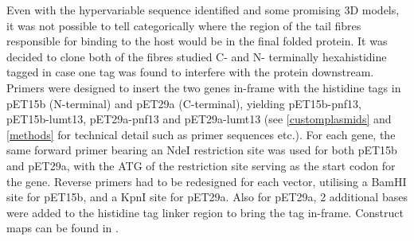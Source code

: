 Even with the hypervariable sequence identified and some promising 3D models, it was not possible to tell categorically where the region of the tail fibres responsible for binding to the host would be in the final folded protein. It was decided to clone both of the fibres studied C- and N- terminally hexahistidine tagged in case one tag was found to interfere with the protein downstream. Primers were designed to insert the two genes in-frame with the histidine tags in pET15b (N-terminal) and pET29a (C-terminal), yielding pET15b-pnf13, pET15b-lumt13, pET29a-pnf13 and pET29a-lumt13 (see \vref{customplasmids} and \vref{methods} for technical detail such as primer sequences etc.). For each gene, the same forward primer bearing an NdeI restriction site was used for both pET15b and pET29a, with the ATG of the restriction site serving as the start codon for the gene. Reverse primers had to be redesigned for each vector, utilising a BamHI site for pET15b, and a KpnI site for pET29a. Also for pET29a, 2 additional bases were added to the histidine tag linker region to bring the tag in-frame. Construct maps can be found in .


